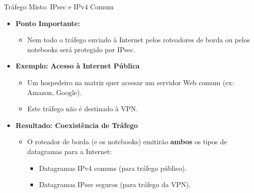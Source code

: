 \begin{frame}{Tráfego Misto: IPsec e IPv4 Comum}
    \begin{itemize}
        \item \textbf{Ponto Importante:}
              \begin{itemize}
                  \item Nem todo o tráfego enviado à Internet pelos roteadores de borda ou pelos notebooks será protegido por IPsec.
              \end{itemize}

        \item \textbf{Exemplo: Acesso à Internet Pública}
              \begin{itemize}
                  \item Um hospedeiro na matriz quer acessar um servidor Web comum (ex: Amazon, Google).
                  \item Este tráfego não é destinado à VPN.
              \end{itemize}

        \item \textbf{Resultado: Coexistência de Tráfego}
              \begin{itemize}
                  \item O roteador de borda (e os notebooks) emitirão \textbf{ambos} os tipos de datagramas para a Internet:
                        \begin{itemize}
                            \item Datagramas IPv4 comuns (para tráfego público).
                            \item Datagramas IPsec seguros (para tráfego da VPN).
                        \end{itemize}
              \end{itemize}
    \end{itemize}
\end{frame}

